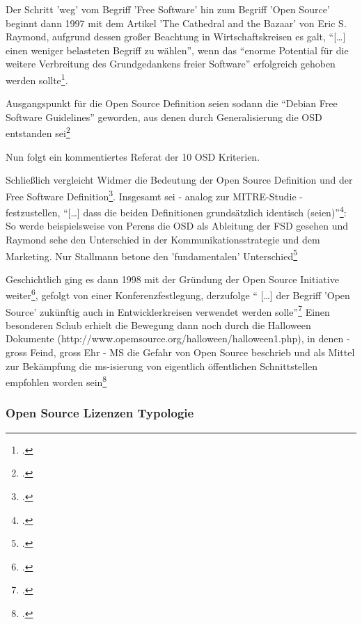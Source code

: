 \documentclass[DIV=calc,BCOR=5mm,11pt,headings=small,oneside,abstract=true, toc=bib]{scrartcl}
\begin{document}
Der Schritt 'weg' vom Begriff 'Free Software' hin zum Begriff 'Open Source'
beginnt dann 1997 mit dem Artikel 'The Cathedral and the Bazaar' von Eric S.
Raymond, aufgrund dessen großer Beachtung in Wirtschaftskreisen es galt,
\enquote{[\ldots] einen weniger belasteten Begriff zu wählen}, wenn das
\enquote{enorme Potential für die weitere Verbreitung des Grundgedankens freier
Software} erfolgreich gehoben werden
sollte\footcite[vgl.][19]{Widmer2003a}.

Ausgangspunkt für die Open Source Definition seien sodann die
\enquote{Debian Free Software Guidelines} geworden, aus denen durch
Generalisierung die OSD entstanden sei\footcite[vgl.][20]{Widmer2003a}

Nun folgt ein kommentiertes Referat der 10 OSD Kriterien.

Schließlich vergleicht Widmer die Bedeutung der Open Source Definition und der
Free Software Definition\footcite[vgl.][28 - Zur Erinnerung: beiden gemeinsam
ist, dass sie notwendige Kriterien von Lizenzmodellen spezifzieren, sie selbst
geben keine Handlungsanleitungen zur Umsetzung. Das tun die Lizenzen. Deshalb
können auch nur aus den Lizenzen selbst jeweils abgeleitet werden, was konkret
zu deren Erfüllung zu tun ist.]{Widmer2003a}. Insgesamt sei - analog zur
MITRE-Studie - festzustellen, \enquote{[\ldots] dass die beiden Definitionen
grundsätzlich identisch (seien)}\footcite[vgl.][28]{Widmer2003a}: So werde
beispielsweise von Perens die OSD als Ableitung der FSD gesehen und Raymond sehe
den Unterschied in der Kommunikationsstrategie und dem Marketing. Nur Stallmann
betone den 'fundamentalen' Unterschied\footcite[vgl.][29]{Widmer2003a}
 
 Geschichtlich ging es dann 1998 mit der Gründung der Open Source Initiative
 weiter\footcite[vgl.][29]{Widmer2003a}, gefolgt von einer Konferenzfestlegung,
 derzufolge \enquote{ [\ldots] der Begriff 'Open Source' zukünftig auch in
 Entwicklerkreisen verwendet werden solle}\footcite[vgl.][30
 originalquelle http://press.oreilly.com/pub/pr/796]{Widmer2003a} Einen
 besonderen Schub erhielt die Bewegung dann noch durch die Halloween Dokumente
 (http://www.opemsource.org/halloween/halloween1.php), in denen - gross Feind,
 gross Ehr - MS die Gefahr von Open Source beschrieb und als Mittel zur
 Bekämpfung die ms-isierung von eigentlich öffentlichen Schnittstellen empfohlen
 worden sein\footcite[vgl.][30]{Widmer2003a}
 
 \subsubsection{Open Source Lizenzen Typologie}
 
\end{document}
